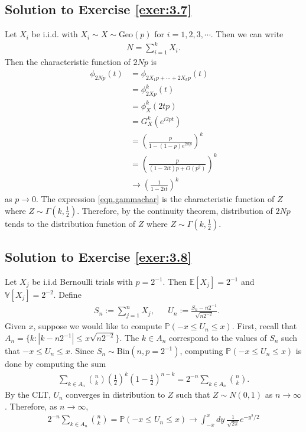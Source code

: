 \documentclass[12pt]{book}
\numberwithin{equation}{chapter}
\theoremstyle{plain}
\numberwithin{theorem}{section}
\theoremstyle{definition}
\numberwithin{exercise}{chapter}
\newcommand{\<}{\langle}
\renewcommand{\>}{\rangle}
\renewcommand{\(}{\left(}
\renewcommand{\)}{\right)}
\renewcommand{\[}{\left[}
\renewcommand{\]}{\right]}
\newcommand\Eb{\mathds{E}}
\newcommand\Pb{\mathds{P}}
\newcommand\Vb{\mathds{V}}
\begin{document}
\subsection*{Solution to Exercise \ref{exer:3.7}}
Let $X_i$ be i.i.d. with $X_i \sim X \sim \text{Geo}(p)$ for $i = 1,2,3,\cdots$. Then we can write
\begin{align}
N
	= \sum_{i=1}^k X_i.
\end{align}
Then the characteristic function of $2 N p$ is
\begin{align}
\phi_{2 N p} (t)
	&= \phi_{2X_1 p + \cdots + 2 X_k p}(t) \\
	&= \phi_{2Xp}^k (t ) \\
	&= \phi_{X}^k ( 2 t p ) \\
	&= G_{X}^k\( e^{i 2 p t} \) \\
	&= \( \frac{p}{1 - (1 - p) e^{2 i t p} }\)^k \\
	&= \( \frac{p}{( 1 - 2 i t)p + O(p^2)} \)^k \\
	&\to \( \frac{ 1}{1 -  2 i t}\)^k \label{eqn.gammachar}
\end{align}
as $p \to 0$. The expression \eqref{eqn.gammachar} is the characteristic function of $Z$ where $Z \sim \Gamma\(k, 
\frac{1}{2}\)$.  Therefore, by the continuity theorem, distribution of $2 N p $ tends to the distribution function of 
$Z$ where $Z \sim \Gamma\( k,\frac{1}{2} \)$.  

\subsection*{Solution to Exercise \ref{exer:3.8}}
Let $X_j$ be i.i.d Bernoulli trials with $p = 2^{-1}$. Then $\Eb[ X_j] = 2^{-1}$ and $\Vb [ X_j] = 2^{-2}$. Define
\begin{align}
&S_n
	:= \sum_{j=1}^n X_j,
&& U_n
	:= \frac{ S_n - n 2^{-1} }{\sqrt{ n 2^{-2}}}.
\end{align}
Given $x$, suppose we would like to compute $\Pb ( -x \leq U_n \leq x)$. First, recall that $A_n = \{ k : |k - n2^{-1}| 
\leq x \sqrt{n 2^{-2}}\}$. The $k \in A_n$ correspond to the values of $S_n$ such that $-x \leq U_n \leq x$. Since $S_n 
\sim \text{Bin}(n,p =2^{-1})$, computing $\Pb ( -x \leq U_n \leq x)$ is done by computing the sum 
\begin{align}
\sum_{ k \in A_n} \binom{n}{k} \( \frac{1}{2}\)^{k} \(1- \frac{1}{2}\)^{n - k}
	= 2^{-n} \sum_{k \in A_n} \binom{n}{k}.
\end{align}
By the CLT,  $U_n$ converges in distribution to $Z$ such that $Z \sim N(0,1)$ as $n \to 
\infty$. Therefore,  as $n\to \infty$,
\begin{align}
2^{-n} \sum_{k \in A_n} \binom{n}{k}
	= \Pb( -x \leq U_n \leq x)
	\to 
	\int_{-x}^x dy\ \frac{1}{\sqrt{2\pi}} e^{-y^2 / 2}
\end{align}
\end{document}
